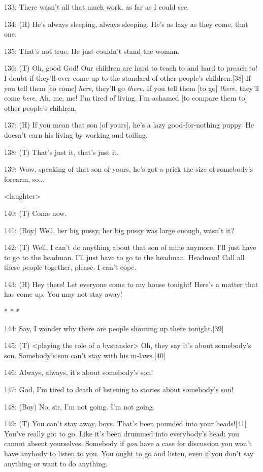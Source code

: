 {133: There wasn't all that much work, as far as I could see.}

{134: (H) He's always sleeping, always sleeping. He's as lazy as they come,
that one.}

{135: That's not true. He just couldn't stand the woman. }

{136: (T) Oh, good God! Our children are hard to teach to and hard to preach
to! I doubt if they'll ever come up to the standard of other people's children.[38]
If you tell them [to come] }{\textit{here}}{, they'll go }{\textit{there}}{.
If you tell them [to go] }{\textit{there}}{, they'll come }{\textit{here}}{.
Ah, me, me! I'm tired of living. I'm ashamed [to compare them to] other people's
children.  }

{137: (H) If you mean that son [of yours], he's a lazy good-for-nothing
puppy. He doesn't earn his living by working and toiling.}

{138: (T) That's just it, that's just it. }

{139: Wow, speaking of that son of yours, he's got a prick the size of somebody's
forearm, so...}

{<laughter>}

{140: (T) Come now. }

{141: (Boy) Well, her big pussy, her big pussy was large enough, wasn't
it?}

{142: (T) Well, I can't do anything about that son of mine anymore. I'll
just have to go to the headman. I'll just have to go to the headman. Headman! Call
all these people together, please. I can't cope. }

{143: (H) Hey there! Let everyone come to my house tonight! Here's a matter
that has come up. You may not stay away!}

\begin{center}
{* * *}
\end{center}

\leftskip=0pt
{144: Say, I wonder why there are people shouting up there tonight.[39]}

{145: (T) <playing the role of a bystander> Oh, they say
it's about somebody's son. Somebody's son can't stay with his in-laws.[40]}

{146: Always, always, it's about somebody's son!}

{147: God, I'm tired to death of listening to stories about somebody's son!}

{148: (Boy) No, sir, I'm not going. I'm not going.}

{149: (T) You can't stay away, boys. That's been pounded into your heads![41]
You've really got to go. Like it's been drummed into everybody's head: you cannot
absent yourselves. Somebody if }{\textit{you}}{ have a case for discussion
you won't have anybody to listen to you. You ought to go and listen, even if you
don't say anything or want to do anything. }

